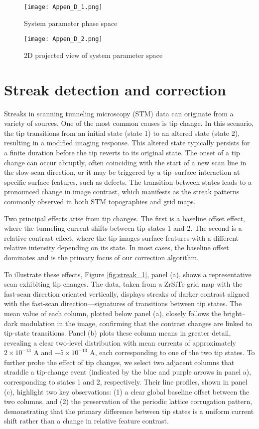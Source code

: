 \begin{figure}
	\texttt{[image: Appen\_D\_1.png]}
	\centering
	\caption{System parameter phase space}
	\label{fig:system_param}
\end{figure}

\begin{figure}
	\centering
	\texttt{[image: Appen\_D\_2.png]}
	\caption{2D projected view of system parameter space}
	\label{fig:proj_system_param}
\end{figure}

\chapter{Streak detection and correction}\label{appen:streak_detection}
Streaks in scanning tunneling microscopy (STM) data can originate from a variety of sources. One of the most common causes is tip change. In this scenario, the tip transitions from an initial state (state 1) to an altered state (state 2), resulting in a modified imaging response. This altered state typically persists for a finite duration before the tip reverts to its original state. The onset of a tip change can occur abruptly, often coinciding with the start of a new scan line in the slow-scan direction, or it may be triggered by a tip–surface interaction at specific surface features, such as defects. The transition between states leads to a pronounced change in image contrast, which manifests as the streak patterns commonly observed in both \ac{STM} topographies and grid maps.

Two principal effects arise from tip changes. The first is a baseline offset effect, where the tunneling current shifts between tip states 1 and 2. The second is a relative contrast effect, where the tip images surface features with a different relative intensity depending on its state. In most cases, the baseline offset dominates and is the primary focus of our correction algorithm.

To illustrate these effects, Figure \ref{fig:streak_1}, panel (a), shows a representative scan exhibiting tip changes. The data, taken from a ZrSiTe grid map with the fast-scan direction oriented vertically, displays streaks of darker contrast aligned with the fast-scan direction—signatures of transitions between tip states. The mean value of each column, plotted below panel (a), closely follows the bright–dark modulation in the image, confirming that the contrast changes are linked to tip-state transitions. Panel (b) plots these column means in greater detail, revealing a clear two-level distribution with mean currents of approximately $2\times10^{-13}$ A and $-5\times10^{-13}$ A, each corresponding to one of the two tip states. To further probe the effect of tip changes, we select two adjacent columns that straddle a tip-change event (indicated by the blue and purple arrows in panel a), corresponding to states 1 and 2, respectively. Their line profiles, shown in panel (c), highlight two key observations: (1) a clear global baseline offset between the two columns, and (2) the preservation of the periodic lattice corrugation pattern, demonstrating that the primary difference between tip states is a uniform current shift rather than a change in relative feature contrast.

